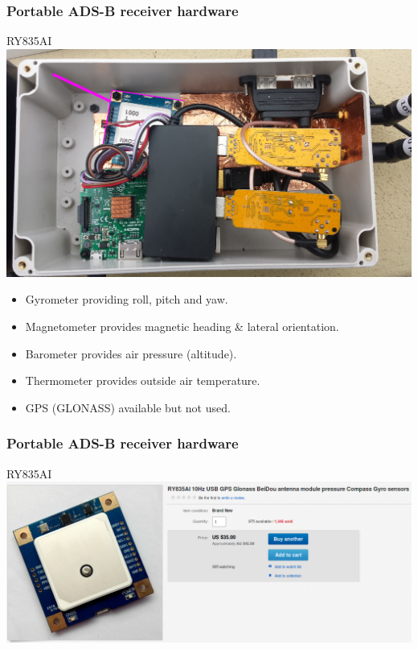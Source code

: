 \begin{frame}
\frametitle{Portable ADS-B receiver hardware}
\begin{block}{RY835AI}
\includegraphics[height=0.5\textheight]{image/adsb-hardware-ry835ai.png}
\tiny
\begin{itemize}
\item Gyrometer providing roll, pitch and yaw.
\item Magnetometer provides magnetic heading \& lateral orientation.
\item Barometer provides air pressure (altitude).
\item Thermometer provides outside air temperature.
\item GPS (GLONASS) available but not used.
\end{itemize}
\end{block}
\end{frame}

\begin{frame}
\frametitle{Portable ADS-B receiver hardware}
\begin{block}{RY835AI}
\includegraphics[height=0.4\textheight]{image/ebay-ry835ai.png}
\end{block}
\end{frame}

